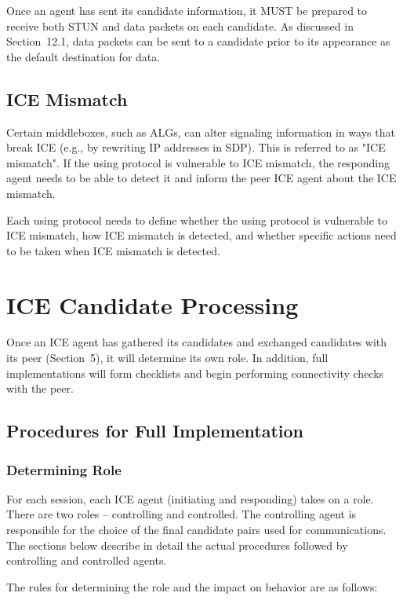 \documentclass{article}
\begin{document}
Once an agent has sent its candidate information, it MUST be prepared to receive both STUN and data packets on each candidate.  As discussed in Section~12.1, data packets can be sent to a candidate prior to its appearance as the default destination for data.

\subsection{ICE Mismatch}

Certain middleboxes, such as ALGs, can alter signaling information in ways that break ICE (e.g., by rewriting IP addresses in SDP).  This is referred to as "ICE mismatch".  If the using protocol is vulnerable to ICE mismatch, the responding agent needs to be able to detect it and inform the peer ICE agent about the ICE mismatch.

Each using protocol needs to define whether the using protocol is vulnerable to ICE mismatch, how ICE mismatch is detected, and whether specific actions need to be taken when ICE mismatch is detected.

\section{ICE Candidate Processing}

Once an ICE agent has gathered its candidates and exchanged candidates with its peer (Section~5), it will determine its own role. In addition, full implementations will form checklists and begin performing connectivity checks with the peer.

\subsection{Procedures for Full Implementation}

\subsubsection{Determining Role}

For each session, each ICE agent (initiating and responding) takes on a role.  There are two roles -- controlling and controlled.  The controlling agent is responsible for the choice of the final candidate pairs used for communications.  The sections below describe in detail the actual procedures followed by controlling and controlled agents.

The rules for determining the role and the impact on behavior are as follows:
\end{document}

